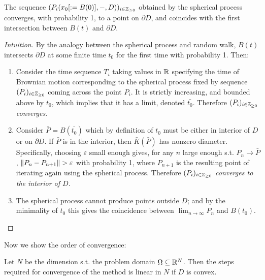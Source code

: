 \documentclass[10pt]{article}
\begin{document}
\begin{proposition}
    The sequence $(P_i(x_0 [:= B(0)], -, D))_{i \in \mathbb{Z}_{\geq 0}}$ obtained by the spherical process converges, with probability 1, to a point on $\partial D$, and coincides with the first intersection between $B(t)$ and $\partial D$.
\end{proposition}

\begin{proof}[Intuition]
    By the analogy between the spherical process and random walk, $B(t)$ intersects $\partial D$ at some finite time $t_0$ for the first time with probability 1. Then:
    \begin{enumerate}
        \item Consider the time sequence $T_i$ taking values in $\mathbb{R}$ specifying the time of Brownian motion corresponding to the spherical process fixed by sequence $(P_i)_{i \in \mathbb{Z}_{\geq 0}}$ coming across the point $P_i$. It is strictly increasing, and bounded above by $t_0$, which implies that it has a limit, denoted $\bar{t_0}$. Therefore \emph{$(P_i)_{i \in \mathbb{Z}_{\geq 0}}$ converges}.
        \item Consider $\bar{P} = B(\bar{t_0})$ which by definition of $t_0$ must be either in interior of $D$ or on $\partial D$. If $\bar{P}$ is in the interior, then $\bar{K}(\bar{P})$ has nonzero diameter. Specifically, choosing $\varepsilon$ small enough gives, for any $n$ large enough s.t. $P_n \to \bar{P}$, $\left\|P_n - P_{n+1}\right\| > \varepsilon$ with probability 1, where $P_{n+1}$ is the resulting point of iterating again using the spherical process. Therefore \emph{$(P_i)_{i \in \mathbb{Z}_{\geq 0}}$ converges to the interior of $D$}.
        \item The spherical process cannot produce points outside $D$; and by the minimality of $t_0$ this gives the coincidence between $\lim_{n \to \infty} P_n$ and $B(t_0)$. 
    \end{enumerate}
\end{proof}

\textstart
Now we show the order of convergence:

\begin{theorem}
    Let $N$ be the dimension s.t. the problem domain $\Omega \subseteq \mathbb{R}^N$. Then the steps required for convergence of the method is linear in $N$ if $D$ is convex. 
\end{theorem}
\end{document}
